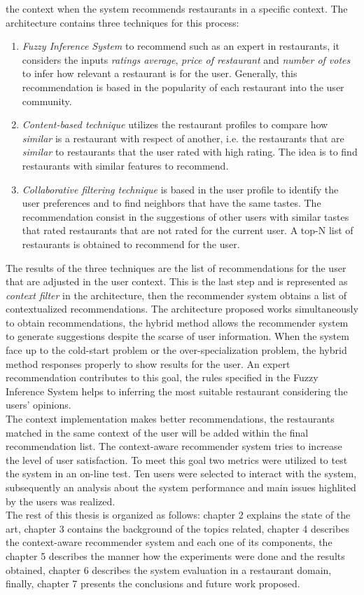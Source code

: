 the context when the system recommends restaurants in a specific
context. The architecture contains three techniques for this process:
\begin{enumerate}  

\item \textit{Fuzzy Inference System} to recommend such as an expert
in restaurants, it considers the inputs \textit{ratings average},
\textit{price of restaurant} and \textit{number of votes} to infer how
relevant a restaurant is for the user.  Generally, this recommendation
is based in the popularity of each restaurant into the user community.
\item \textit{Content-based technique} utilizes the restaurant profiles 
to compare how \textit{similar} is a restaurant with respect of another, i.e.  
the restaurants that are \textit{similar} to restaurants 
that the user rated with high rating. The idea is to find restaurants 
with similar features to recommend. 
\item \textit{Collaborative filtering
technique} is based in the user profile to identify the user
preferences and to find neighbors that have the same tastes. The
recommendation consist in the suggestions of other users with similar
tastes that rated restaurants that are not rated for the current user.
A top-N list of restaurants is obtained to recommend for the user. 
\end{enumerate}  
The results of the three techniques are the list of
recommendations for the user that  are adjusted in the user context.
This is the last step and is represented as \textit{context filter} in
the architecture, then the recommender system obtains a list of
contextualized recommendations. The architecture proposed works
simultaneously to obtain recommendations, the hybrid method allows the
recommender system to generate suggestions despite the scarse
of user information. When the system face up to the cold-start
problem or the over-specialization problem, the hybrid method
responses properly to show results for the user. An expert 
recommendation contributes to this goal, the rules specified in 
the Fuzzy Inference System helps to inferring the most suitable 
restaurant considering the users' opinions.\\
The context implementation makes better recommendations, the
restaurants matched in the same context of the user will be added
within the final recommendation list. The context-aware recommender
system tries to increase the level of user satisfaction. To meet this
goal two metrics were utilized to test the system in an on-line test.
Ten users were selected to interact with the system, subsequently an
analysis about the system performance and main issues highlited by the
users was realized. \\
The rest of this thesis is organized as follows: chapter 2 explains
the state of the art,  chapter 3 contains the background of the topics
related, chapter 4  describes the context-aware recommender system and
each one of its components, the chapter 5 describes the manner how the
experiments were done  and the results obtained, chapter 6 describes
the system evaluation in a restaurant domain, finally, chapter 7
presents the conclusions and future work proposed.




